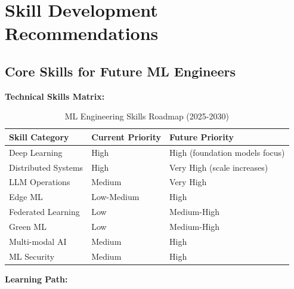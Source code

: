 \section{Skill Development Recommendations}

\subsection{Core Skills for Future ML Engineers}

\textbf{Technical Skills Matrix:}

\begin{table}[h]
\centering
\caption{ML Engineering Skills Roadmap (2025-2030)}
\begin{tabular}{p{3cm}p{5cm}p{4.5cm}}
\toprule
\textbf{Skill Category} & \textbf{Current Priority} & \textbf{Future Priority} \\
\midrule
Deep Learning & High & High (foundation models focus) \\
\midrule
Distributed Systems & High & Very High (scale increases) \\
\midrule
LLM Operations & Medium & Very High \\
\midrule
Edge ML & Low-Medium & High \\
\midrule
Federated Learning & Low & Medium-High \\
\midrule
Green ML & Low & Medium-High \\
\midrule
Multi-modal AI & Medium & High \\
\midrule
ML Security & Medium & High \\
\bottomrule
\end{tabular}
\end{table}

\textbf{Learning Path:}

